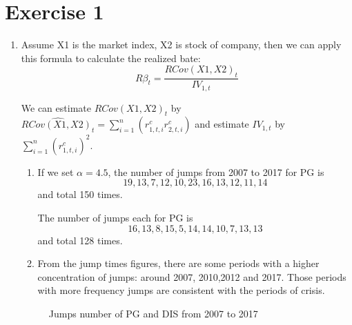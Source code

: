 \documentclass[12pt,letterpaper]{article}
\begin{document}
\section*{Exercise 1}
  \begin{enumerate}[label=\textbf{(\Alph*)}]
\item Assume X1 is the market index, X2 is stock of company, then we can apply this formula to calculate the realized bate:
$$R\beta_t=\frac{RCov(X1,X2)_t}{IV_{1,t}}$$ 

We can estimate $RCov(X1,X2)_t$ by $\hat{RCov(X1,X2)_t}=\sum_{i=1}^{n} (r_{1,t,i}^c r_{2,t,i}^c)$ and estimate $IV_{1,t}$ by $\sum_{i=1}^n (r_{1,t,i}^c)^2$.
  
\begin{enumerate}[label=(\roman*)]
\item If we set $\alpha=4.5$, the number of jumps from 2007 to 2017 for PG is 
\[19, 13,7,12,10,23,16,13,12,11,14\] and total 150 times. 

The number of jumps each for PG is \[16,13,8,15,5,14,14,10,7,13,13\] and total 128 times.

\item From the jump times figures, there are some periods with a higher concentration of jumps: around 2007, 2010,2012 and 2017. Those periods with more frequency jumps are consistent with the periods of crisis. \\

  \end{enumerate}


  \begin{figure}[H]
            \centering
            \caption{Jumps number of PG and DIS from 2007 to 2017}
\end{figure}




\end{enumerate}
\end{document}
